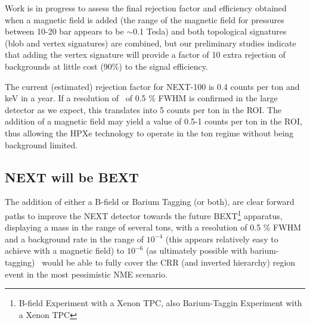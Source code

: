  Work is in progress to assess the final rejection factor and efficiency obtained when a magnetic field is added (the range of the magnetic field for pressures between 10-20 bar appears to be $\sim$0.1 Tesla) and both topological signatures (blob and vertex signatures) are combined, but our preliminary studies indicate that adding the vertex signature will provide a factor of 10 extra rejection of backgrounds at little cost (90\%) to the signal efficiency.  
 
 The current (estimated) rejection factor for NEXT-100 is 0.4 counts per ton and keV in a year. If a resolution of \Qbb\ of 0.5 \% FWHM is confirmed in the large detector as we expect, this translates into 5 counts per ton in the ROI. The addition of a magnetic field may yield a value of 0.5-1 counts per ton in the ROI, thus allowing the HPXe technology to operate in the ton regime without being background limited. 
  
\subsection{NEXT will be BEXT}
The addition of either a B-field or Barium Tagging (or both), are clear forward paths to improve the NEXT detector towards the future BEXT\footnote{B-field Experiment with a Xenon TPC, also Barium-Taggin Experiment with a Xenon TPC} apparatus, displaying  
a mass in the range of several tons, with a resolution of 0.5 \% FWHM and a background rate in the range of $10^{-4}$ (this appears relatively easy to achieve with a magnetic field) to $10^{-6}$ (as ultimately possible with barium-tagging) \ckky\ would be able to fully cover the CRR (and inverted hierarchy) region event in the most pessimistic NME scenario. 



